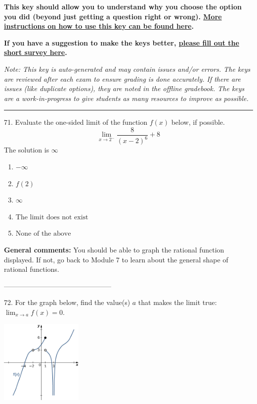 \documentclass{extbook}[14pt]
\begin{document}
\textbf{This key should allow you to understand why you choose the option you did (beyond just getting a question right or wrong). \href{https://xronos.clas.ufl.edu/mac1105spring2020/courseDescriptionAndMisc/Exams/LearningFromResults}{More instructions on how to use this key can be found here}.}

\textbf{If you have a suggestion to make the keys better, \href{https://forms.gle/CZkbZmPbC9XALEE88}{please fill out the short survey here}.}

\textit{Note: This key is auto-generated and may contain issues and/or errors. The keys are reviewed after each exam to ensure grading is done accurately. If there are issues (like duplicate options), they are noted in the offline gradebook. The keys are a work-in-progress to give students as many resources to improve as possible.}

\rule{\textwidth}{0.4pt}

71. Evaluate the one-sided limit of the function $f(x)$ below, if possible.
\[ \lim_{x \rightarrow 2^-} \frac{8}{(x-2)^6}+8 \] 
The solution is $ \infty $ 

\begin{enumerate}[label=\Alph*.] 
\item $ -\infty $ 

  
\item $ f(2) $ 

  
\item $ \infty $ 

  
\item $ \text{The limit does not exist} $ 

  
\item $ \text{None of the above} $ 

  
\end{enumerate} 
 
\textbf{General comments:} You should be able to graph the rational function displayed. If not, go back to Module 7 to learn about the general shape of rational functions.

-----------------------------------------------

72. For the graph below, find the value(s) $a$ that makes the limit true: $ \displaystyle \lim_{x \rightarrow a} f(x) = 0$.
\begin{center} \includegraphics[width=0.3\textwidth]{../Figures/evaluateLimitGraphicallyB.png} \end{center} 
\end{document}

